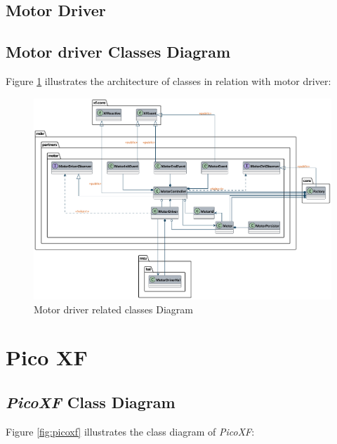 \documentclass[report.tex]{subfiles}
\begin{document}
\begin{landscape}
\section{Motor Driver}
\subsection{Motor driver Classes Diagram}

Figure \ref{fig:motorDriving} illustrates the architecture of classes in relation with motor driver: 

\begin{figure}[H]
	\centering
	\includegraphics[width=1.1\textwidth]{Include/Figure/software/class/motorDriving.pdf}
	\caption{Motor driver related classes Diagram}
	\label{fig:motorDriving}
\end{figure}
\end{landscape}

\section{Pico XF}
\subsection{\textit{PicoXF} Class Diagram}

Figure \ref{fig:picoxf} illustrates the class diagram of \textit{PicoXF}: 
\end{document}
